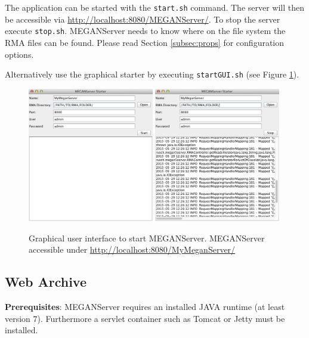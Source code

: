 \documentclass[11pt]{article}
\begin{document}
The application can be started with the \texttt{start.sh} command. The server will then be accessible via \url{http://localhost:8080/MEGANServer/}. To stop the server execute \texttt{stop.sh}. MEGANServer needs to know where on the file system the RMA files can be found. Please read Section \ref{subsec:props} for configuration options.


Alternatively use the graphical starter by executing \texttt{startGUI.sh} (see Figure \ref{fig:starter}).
\begin{figure}[h!]

  \centering
    \includegraphics[width=0.49\textwidth]{ServerStarter1.png}
    \includegraphics[width=0.49\textwidth]{ServerStarter2.png}
    \caption{Graphical user interface to start MEGANServer. MEGANServer accessible under \url{http://localhost:8080/MyMeganServer/}}
    \label{fig:starter}
\end{figure}


\subsection{Web Archive}
\textbf{Prerequisites}: MEGANServer requires an installed JAVA runtime (at least version 7). Furthermore a servlet container such as Tomcat or Jetty must be installed.
\end{document}
